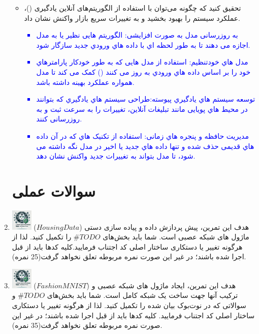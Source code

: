 \documentclass[12pt]{article}
\begin{document}
\begin{enumerate}
\begin{itemize}
        \item تحقیق کنید که چگونه می‌توان با استفاده از الگوریتم‌های آنلاین یادگیری ()، عملکرد سیستم را بهبود بخشید و به تغییرات سریع بازار واکنش نشان داد.
        
        \textcolor{blue}{
        \begin{itemize}
            \item به روزرسانی مدل به صورت افزایشی: الگوریتم هایی نظیر  یا  به مدل اجازه می دهند تا به طور
            لحظه اي با داده هاي ورودي جدید سازگار شود.
            \item مدل هاي خودتنظیم: استفاده از مدل هایی که به طور خودکار پارامترهاي خود را بر اساس داده هاي ورودي به روز می کنند () کمک می کند تا مدل همواره عملکرد بهینه داشته باشد.
            \item توسعه سیستم هاي یادگیري پیوسته:طراحی سیستم هاي یادگیري که بتوانند در محیط هاي پویایی مانند تبلیغات آنلاین، تغییرات را به سرعت ثبت و به روزرسانی کنند.
            \item مدیریت حافظه و پنجره هاي زمانی: استفاده از تکنیک هاي  که در آن داده هاي قدیمی حذف شده و تنها داده هاي جدید یا اخیر در مدل نگه داشته می شود، تا مدل بتواند به تغییرات جدید واکنش نشان دهد.
        \end{itemize}
        }
    \end{itemize}
       
    \section*{سوالات عملی} 
    \item \includegraphics[width=1cm]{figs/Allowed_recommended.jpg}
    ($HousingData$) هدف این تمرین، پیش پردازش داده و پیاده سازی دستی ماژول های شبکه عصبی است. شما باید بخش‌های $\#TODO$ را تکمیل کنید. لذا از هرگونه تغییر یا دستکاری ساختار اصلی کد اجتناب فرمایید.کلیه کدها باید از قبل اجرا شده باشند؛ در غیر این صورت نمره مربوطه تعلق نخواهد گرفت(25 نمره).
    
    \item \includegraphics[width=1cm]{figs/Allowed_recommended.jpg}
    ($FashionMNIST$) هدف این تمرین، ایجاد ماژول های شبکه عصبی و ترکیب آنها جهت ساخت یک شبکه کامل است. شما باید بخش‌های $\#TODO$ و سوالاتی که در نوت‌بوک بیان شده را تکمیل کنید. لذا از هرگونه تغییر یا دستکاری ساختار اصلی کد اجتناب فرمایید. کلیه کدها باید از قبل اجرا شده باشند؛ در غیر این صورت نمره مربوطه تعلق نخواهد گرفت(35 نمره).
\end{enumerate}
\end{document}
